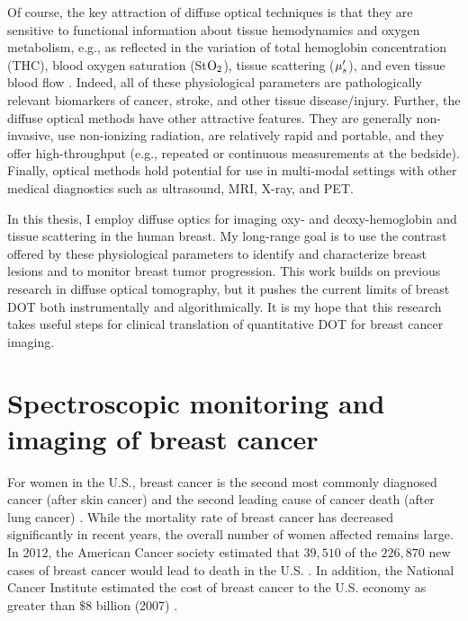 Of course, the key attraction of diffuse optical techniques is that they are sensitive to functional information about tissue hemodynamics and oxygen metabolism, e.g., as reflected in the variation of total hemoglobin concentration (THC), blood oxygen saturation (St$\rm{O_2}$), tissue scattering ($\mu_s^{\prime}$), and even tissue blood flow \cite{Culver2003a,Culver2003b,Durduran2004,Durduran2004b,Durduran2005,Yu2005,Yu2005a,Sunar2006,Zhou2006,Yu2007,Zhou2007,Carp2010,Kim2010,Shang2010,Diop2011,Irwin2011,Li2013,Durduran2014}. Indeed, all of these physiological parameters are pathologically relevant biomarkers of cancer, stroke, and other tissue disease/injury. Further, the diffuse optical methods have other attractive features. They are generally non-invasive, use non-ionizing radiation, are relatively rapid and portable, and they offer high-throughput (e.g., repeated or continuous measurements at the bedside). Finally, optical methods hold potential for use in multi-modal settings with other medical diagnostics such as ultrasound, MRI, X-ray, and PET.

In this thesis, I employ diffuse optics for imaging oxy- and deoxy-hemoglobin and tissue scattering in the human breast. My long-range goal is to use the contrast offered by these physiological parameters to identify and characterize breast lesions and to monitor breast tumor progression. This work builds on previous research in diffuse optical tomography, but it pushes the current limits of breast DOT both instrumentally and algorithmically. It is my hope that this research takes useful steps for clinical translation of quantitative DOT for breast cancer imaging.

\section{Spectroscopic monitoring and imaging of breast cancer}
For women in the U.S., breast cancer is the second most commonly diagnosed cancer (after skin cancer) and the second leading cause of cancer death (after lung cancer) \cite{Ma2013}.  While the mortality rate of breast cancer has decreased significantly in recent years, the overall number of women affected remains large. In $2012$, the American Cancer society estimated that $39,510$ of the $226,870$ new cases of breast cancer would lead to death in the U.S. \cite{Jemal2010}. In addition, the National Cancer Institute estimated the cost of breast cancer to the U.S. economy as greater than $\$8$ billion (2007) \cite{Barron2008}. 

